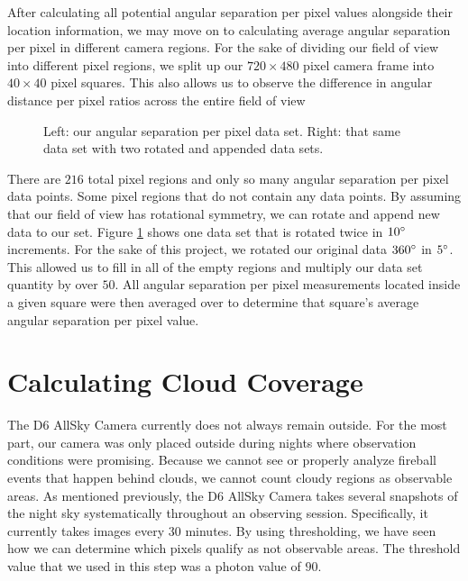 After calculating all potential angular separation per pixel values alongside their location information, we may move on to calculating average angular separation per pixel in different camera regions.
For the sake of dividing our field of view into different pixel regions, we split up our $720 \times 480$ pixel camera frame into $40 \times 40$ pixel squares.
This also allows us to observe the difference in angular distance per pixel ratios across the entire field of view

\begin{figure}[h]
  \centering
  \caption{Left: our angular separation per pixel data set. Right: that same data set with two rotated and appended data sets.}
  \label{rotate}
\end{figure}


There are $216$ total pixel regions and only so many angular separation per pixel data points.
Some pixel regions that do not contain any data points.
By assuming that our field of view has rotational symmetry, we can rotate and append new data to our set.
Figure \ref{rotate} shows one data set that is rotated twice in $10 \degree$ increments.
For the sake of this project, we rotated our original data $360 \degree$ in $5 \degree$.  
This allowed us to fill in all of the empty regions and multiply our data set quantity by over $50$.
All angular separation per pixel measurements located inside a given square were then averaged over to determine that square's average angular separation per pixel value.

\section{Calculating Cloud Coverage}

The D6 AllSky Camera currently does not always remain outside.
For the most part, our camera was only placed outside during nights where observation conditions were promising.
Because we cannot see or properly analyze fireball events that happen behind clouds, we cannot count cloudy regions as observable areas.
As mentioned previously, the D6 AllSky Camera takes several snapshots of the night sky systematically throughout an observing session.
Specifically, it currently takes images every $30$ minutes.
By using thresholding, we have seen how we can determine which pixels qualify as not observable areas.
The threshold value that we used in this step was a photon value of $90$.



